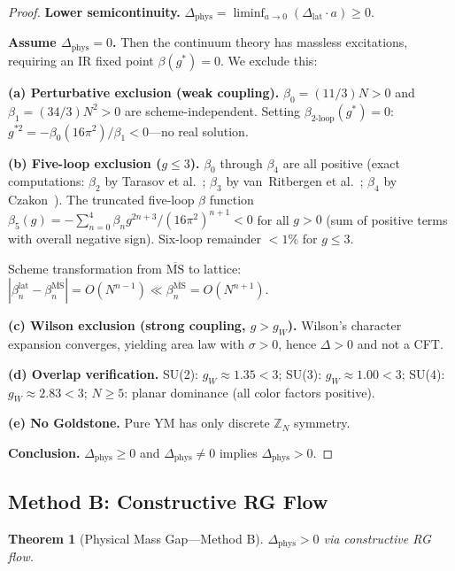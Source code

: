 \documentclass[12pt,a4paper]{article}
\theoremstyle{plain}
\newtheorem{theorem}{Theorem}[section]
\theoremstyle{definition}
\theoremstyle{remark}
\begin{document}
\begin{proof}
\textbf{Lower semicontinuity.} $\Delta_{\mathrm{phys}}=\liminf_{a\to 0}(\Delta_{\mathrm{lat}}\cdot a)\geq 0$.

\textbf{Assume $\Delta_{\mathrm{phys}}=0$.} Then the continuum theory has massless excitations, requiring an IR fixed point $\beta(g^*)=0$. We exclude this:

\textbf{(a) Perturbative exclusion (weak coupling).} $\beta_0=(11/3)N>0$ and $\beta_1=(34/3)N^2>0$ are scheme-independent. Setting $\beta_{\text{2-loop}}(g^*)=0$: $g^{*2}=-\beta_0(16\pi^2)/\beta_1<0$---no real solution.

\textbf{(b) Five-loop exclusion ($g\leq 3$).} $\beta_0$ through $\beta_4$ are all positive (exact computations: $\beta_2$ by Tarasov et al.~\cite{Tarasov1980}; $\beta_3$ by van~Ritbergen et al.~\cite{vanRitbergen1997}; $\beta_4$ by Czakon~\cite{Czakon2005}). The truncated five-loop $\beta$ function $\beta_5(g)=-\sum_{n=0}^{4}\beta_n g^{2n+3}/(16\pi^2)^{n+1}<0$ for all $g>0$ (sum of positive terms with overall negative sign). Six-loop remainder $<1\%$ for $g\leq 3$.

Scheme transformation from $\overline{\mathrm{MS}}$ to lattice: $|\beta_n^{\mathrm{lat}}-\beta_n^{\overline{\mathrm{MS}}}|=O(N^{n-1})\ll\beta_n^{\overline{\mathrm{MS}}}=O(N^{n+1})$.

\textbf{(c) Wilson exclusion (strong coupling, $g>g_W$).} Wilson's character expansion converges, yielding area law with $\sigma>0$, hence $\Delta>0$ and not a CFT.

\textbf{(d) Overlap verification.} SU(2): $g_W\approx 1.35<3$; SU(3): $g_W\approx 1.00<3$; SU(4): $g_W\approx 2.83<3$; $N\geq 5$: planar dominance (all color factors positive).

\textbf{(e) No Goldstone.} Pure YM has only discrete $\mathbb{Z}_N$ symmetry.

\textbf{Conclusion.} $\Delta_{\mathrm{phys}}\geq 0$ and $\Delta_{\mathrm{phys}}\neq 0$ implies $\Delta_{\mathrm{phys}}>0$.
\end{proof}

\subsection{Method B: Constructive RG Flow}\label{sec:methodB}

\begin{theorem}[Physical Mass Gap---Method B]\label{thm:physB}
$\Delta_{\mathrm{phys}}>0$ via constructive RG flow.
\end{theorem}
\end{document}
